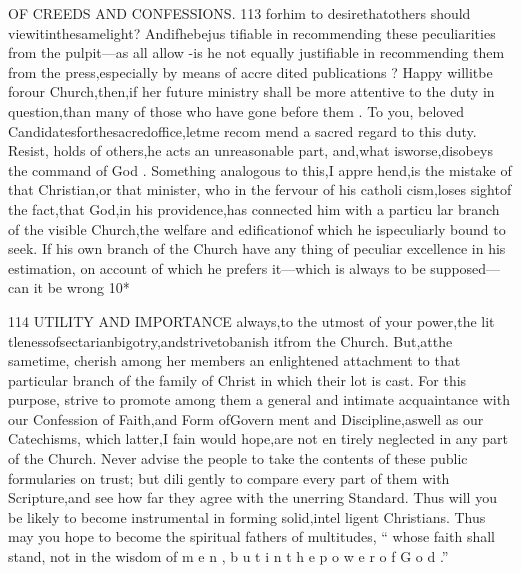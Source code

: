\documentclass[
]{book}
\begin{document}
OF CREEDS AND CONFESSIONS. 113
forhim to desirethatothers should
viewitinthesamelight? Andifhebejus tifiable in recommending these peculiarities
from the pulpit---as all allow -is he not
equally justifiable in recommending them from the press,especially by means of accre dited publications ?
Happy willitbe forour Church,then,if her future ministry shall be more attentive to the duty in question,than many of those who have gone before them . To you, beloved Candidatesforthesacredoffice,letme recom mend a sacred regard to this duty. Resist,
holds of others,he acts an unreasonable part,
and,what isworse,disobeys the command of God . Something analogous to this,I appre hend,is the mistake of that Christian,or that minister, who in the fervour of his catholi cism,loses sightof the fact,that God,in his providence,has connected him with a particu lar branch of the visible Church,the welfare and edificationof which he ispeculiarly bound to seek. If his own branch of the Church have any thing of peculiar excellence in his estimation, on account of which he prefers it---which is always to be supposed--- can it
be
wrong
10*

114 UTILITY AND IMPORTANCE
always,to the utmost of your power,the lit tlenessofsectarianbigotry,andstrivetobanish itfrom the Church. But,atthe sametime,
cherish among her members an enlightened attachment to that particular branch of the family of Christ in which their lot is cast. For this purpose, strive to promote among
them a general and intimate acquaintance with our Confession of Faith,and Form ofGovern
ment and Discipline,aswell as our Catechisms, which latter,I fain would hope,are not en tirely neglected in any part of the Church. Never advise the people to take the contents of these public formularies on trust; but dili gently to compare every part of them with Scripture,and see how far they agree with the unerring Standard. Thus will you be likely to become instrumental in forming solid,intel ligent Christians. Thus may you hope to become the spiritual fathers of multitudes, `` whose faith shall stand, not in the wisdom of m e n , b u t i n t h e p o w e r o f G o d .''
\end{document}
